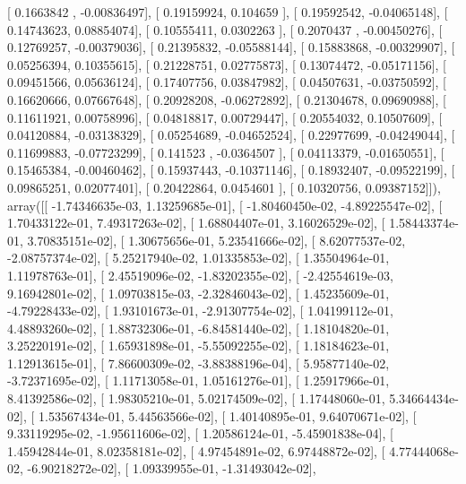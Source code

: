 \documentclass{article}
\begin{document}
       [ 0.1663842 , -0.00836497],
       [ 0.19159924,  0.104659  ],
       [ 0.19592542, -0.04065148],
       [ 0.14743623,  0.08854074],
       [ 0.10555411,  0.0302263 ],
       [ 0.2070437 , -0.00450276],
       [ 0.12769257, -0.00379036],
       [ 0.21395832, -0.05588144],
       [ 0.15883868, -0.00329907],
       [ 0.05256394,  0.10355615],
       [ 0.21228751,  0.02775873],
       [ 0.13074472, -0.05171156],
       [ 0.09451566,  0.05636124],
       [ 0.17407756,  0.03847982],
       [ 0.04507631, -0.03750592],
       [ 0.16620666,  0.07667648],
       [ 0.20928208, -0.06272892],
       [ 0.21304678,  0.09690988],
       [ 0.11611921,  0.00758996],
       [ 0.04818817,  0.00729447],
       [ 0.20554032,  0.10507609],
       [ 0.04120884, -0.03138329],
       [ 0.05254689, -0.04652524],
       [ 0.22977699, -0.04249044],
       [ 0.11699883, -0.07723299],
       [ 0.141523  , -0.0364507 ],
       [ 0.04113379, -0.01650551],
       [ 0.15465384, -0.00460462],
       [ 0.15937443, -0.10371146],
       [ 0.18932407, -0.09522199],
       [ 0.09865251,  0.02077401],
       [ 0.20422864,  0.0454601 ],
       [ 0.10320756,  0.09387152]]), array([[ -1.74346635e-03,   1.13259685e-01],
       [ -1.80460450e-02,  -4.89225547e-02],
       [  1.70433122e-01,   7.49317263e-02],
       [  1.68804407e-01,   3.16026529e-02],
       [  1.58443374e-01,   3.70835151e-02],
       [  1.30675656e-01,   5.23541666e-02],
       [  8.62077537e-02,  -2.08757374e-02],
       [  5.25217940e-02,   1.01335853e-02],
       [  1.35504964e-01,   1.11978763e-01],
       [  2.45519096e-02,  -1.83202355e-02],
       [ -2.42554619e-03,   9.16942801e-02],
       [  1.09703815e-03,  -2.32846043e-02],
       [  1.45235609e-01,  -4.79228433e-02],
       [  1.93101673e-01,  -2.91307754e-02],
       [  1.04199112e-01,   4.48893260e-02],
       [  1.88732306e-01,  -6.84581440e-02],
       [  1.18104820e-01,   3.25220191e-02],
       [  1.65931898e-01,  -5.55092255e-02],
       [  1.18184623e-01,   1.12913615e-01],
       [  7.86600309e-02,  -3.88388196e-04],
       [  5.95877140e-02,  -3.72371695e-02],
       [  1.11713058e-01,   1.05161276e-01],
       [  1.25917966e-01,   8.41392586e-02],
       [  1.98305210e-01,   5.02174509e-02],
       [  1.17448060e-01,   5.34664434e-02],
       [  1.53567434e-01,   5.44563566e-02],
       [  1.40140895e-01,   9.64070671e-02],
       [  9.33119295e-02,  -1.95611606e-02],
       [  1.20586124e-01,  -5.45901838e-04],
       [  1.45942844e-01,   8.02358181e-02],
       [  4.97454891e-02,   6.97448872e-02],
       [  4.77444068e-02,  -6.90218272e-02],
       [  1.09339955e-01,  -1.31493042e-02],
\end{document}
